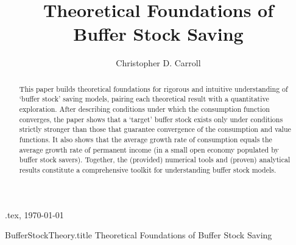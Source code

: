 \documentclass[./BufferStockTheory.tex]{subfiles}
\begin{document}
\hfill{\tiny \texname.tex, \today}

\begin{verbatimwrite}{BufferStockTheory.title}  %
Theoretical Foundations of Buffer Stock Saving
\end{verbatimwrite}

\title{Theoretical Foundations of \\ Buffer Stock Saving}

\author{Christopher D. Carroll\authNum}



\maketitle 

\hypertarget{abstract}{}
\begin{abstract}
This paper builds theoretical foundations for rigorous and intuitive understanding of `buffer stock' saving models, pairing each theoretical result with a quantitative exploration.  After describing conditions under which the consumption function converges, the paper shows that a `target' buffer stock exists only under conditions strictly stronger than those that guarantee convergence of the consumption and value functions.  It also shows that the average growth rate of consumption equals the average growth rate of permanent income (in a small open economy populated by buffer stock savers).  Together, the (provided) numerical tools and (proven) analytical results constitute a comprehensive toolkit for understanding buffer stock models.
\end{abstract}
\end{document}
